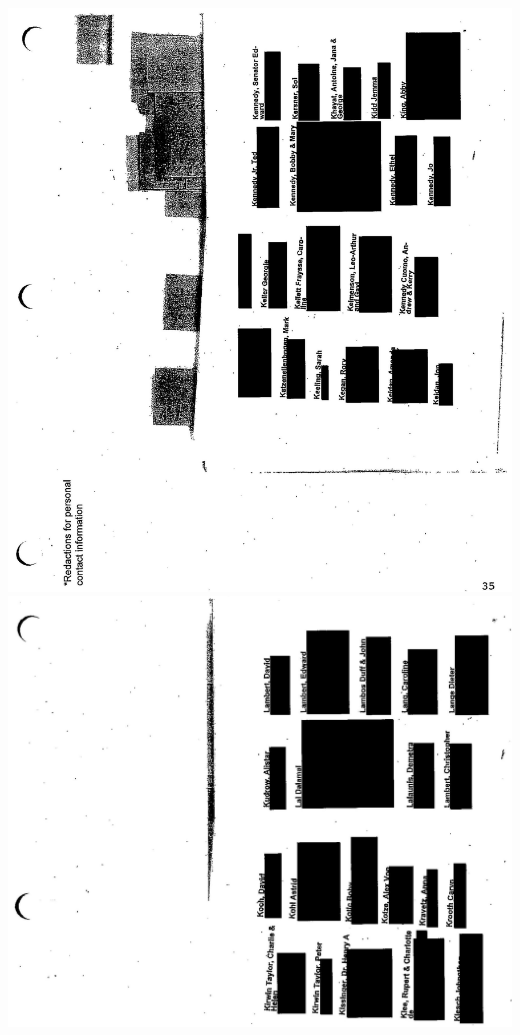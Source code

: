 \documentclass[10pt]{article}
\begin{document}
\includegraphics[max width=\textwidth, center]{2025_02_27_dd68c3d38de88f0516d9g-152}\\
\includegraphics[max width=\textwidth, center]{2025_02_27_dd68c3d38de88f0516d9g-153}\\
\end{document}
